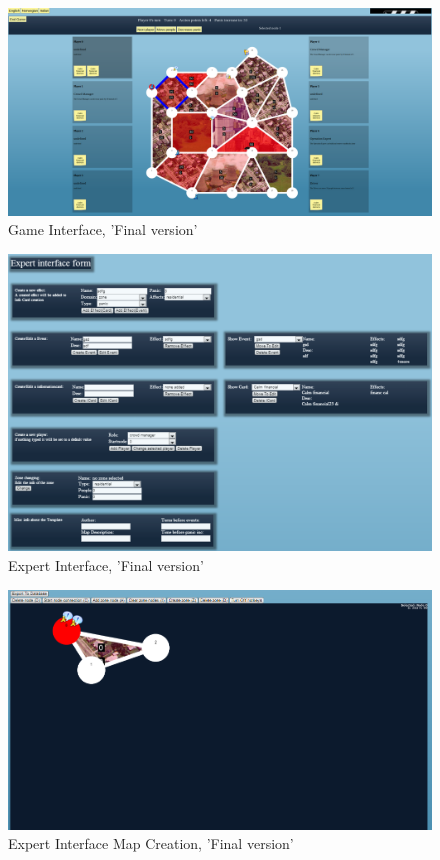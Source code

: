 \begin{figure}[H]
  \centering
    \includegraphics[width=1.0\textwidth]{img/gamefinal.png}
  \caption{Game Interface, 'Final version'} 
  \label{fig:gamefinal}
\end{figure}

\begin{figure}[H]
  \centering
    \includegraphics[width=1.0\textwidth]{img/ExpertInterfaceForms.png}
  \caption{Expert Interface, 'Final version'} 
  \label{fig:EcpertInterfaceForm}
\end{figure}


\begin{figure}[H]
  \centering
    \includegraphics[width=1.0\textwidth]{img/ExpertInterfaceCanvas.png}
  \caption{Expert Interface Map Creation, 'Final version'} 
  \label{fig:EcpertInterfaceCanvas}
\end{figure}

